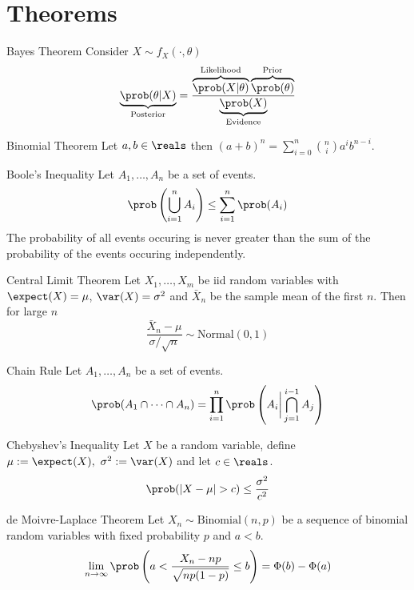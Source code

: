 \documentclass[11pt,a4paper]{article}
\begin{document}
\section{Theorems}

\begin{theorem}{Bayes Theorem}
  Consider $X\sim f_X(\cdot,\theta)$
\[ \underbrace{\prob(\theta|X)}_\text{Posterior}=\dfrac{\overbrace{\prob(X|\theta)}^\text{Likelihood}\overbrace{\prob(\theta)}^\text{Prior}}{\underbrace{\prob(X)}_\text{Evidence}} \]
\end{theorem}

\begin{theorem}{Binomial Theorem}
Let $a,b\in\reals$ then $(a+b)^n=\displaystyle\sum_{i=0}^n{n\choose i}a^ib^{n-i}$.
\end{theorem}

\begin{theorem}{Boole's Inequality}
Let $A_1,\dots,A_n$ be a set of events.
\[ \prob\left(\bigcup\limits_{i=1}^nA_i\right)\leq\sum_{i=1}^n\prob(A_i) \]
The probability of all events occuring is never greater than the sum of the probability of the events occuring independently.
\end{theorem}

\begin{theorem}{Central Limit Theorem}
  Let $X_1,\dots,X_m$ be iid random variables with $\expect(X)=\mu$, $\var(X)=\sigma^2$ and $\bar{X}_n$ be the sample mean of the first $n$. Then for large $n$
  \[\frac{\bar{X}_n-\mu}{\sigma/\sqrt{n}}\sim\text{Normal}(0,1)\]
\end{theorem}

\begin{theorem}{Chain Rule}
  Let $A_1,\dots,A_n$ be a set of events.
  \[ \prob(A_1\cap\dots\cap A_n)=\prod_{i=1}^n\prob\left(A_i\bigg|\bigcap_{j=1}^{i-1}A_j\right) \]
\end{theorem}

\begin{theorem}{Chebyshev's Inequality}
Let $X$ be a random variable, define $\mu:=\expect(X),\ \sigma^2:=\var(X)$ and let $c\in\reals$.
\[ \prob(|X-\mu|>c)\leq\frac{\sigma^2}{c^2} \]
\end{theorem}

\begin{theorem}{de Moivre-Laplace Theorem}
Let $X_n\sim\text{Binomial}(n,p)$ be a sequence of binomial random variables with fixed probability $p$ and $a<b$.
\[ \lim_{n\to\infty}\prob\left(a<\dfrac{X_n-np}{\sqrt{np(1-p)}}\leq b\right)=\Phi(b)-\Phi(a) \]
\end{theorem}
\end{document}
